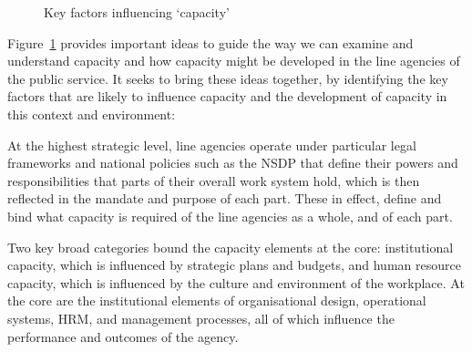 \documentclass[
  10pt,
]{report}
\begin{document}
\begin{figure}[H]


\caption{\label{fig-factors-influencing-capacity}Key factors influencing
`capacity'}

\end{figure}%

Figure~\ref{fig-factors-influencing-capacity} provides important ideas
to guide the way we can examine and understand capacity and how capacity
might be developed in the line agencies of the public service. It seeks
to bring these ideas together, by identifying the key factors that are
likely to influence capacity and the development of capacity in this
context and environment:

At the highest strategic level, line agencies operate under particular
legal frameworks and national policies such as the NSDP that define
their powers and responsibilities that parts of their overall work
system hold, which is then reflected in the mandate and purpose of each
part. These in effect, define and bind what capacity is required of the
line agencies as a whole, and of each part.

Two key broad categories bound the capacity elements at the core:
institutional capacity, which is influenced by strategic plans and
budgets, and human resource capacity, which is influenced by the culture
and environment of the workplace. At the core are the institutional
elements of organisational design, operational systems, HRM, and
management processes, all of which influence the performance and
outcomes of the agency.
\end{document}

